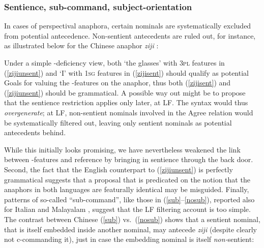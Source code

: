 \documentclass[output=paper, modfonts, nonflat]{langsci/langscibook}
\begin{document}
 \subsubsection{Sentience, sub-command, subject-orientation}

 In cases of perspectival anaphora, certain nominals are
 systematically excluded from potential antecedence. Non-sentient
 antecedents are ruled out, for instance, as illustrated below for the
 Chinese anaphor \textit{ziji} \citep{huangliu:2001}:

  \z

\noindent Under a simple \ph-deficiency view, both `the glasses' with
 \textsc{3pl} features in (\ref{zijiunsent}) and `I' with \textsc{1sg}
 features in (\ref{zijisent}) should qualify as potential Goals for
 valuing the \ph-features on the anaphor, thus both (\ref{zijisent})
 and (\ref{zijiunsent}) should be grammatical. A possible way out might
 be to propose that the sentience restriction applies only later, at
 LF. The syntax would thus \emph{overgenerate}; at LF, non-sentient
 nominals involved in the Agree relation would be systematically
 filtered out, leaving only sentient nominals as potential antecedents
 behind.

 While this initially looks promising, we have nevertheless
 weakened the link between \ph-features and reference by bringing in
 sentience through the back door. Second, the fact that the English
 counterpart to (\ref{zijiunsent}) is perfectly grammatical suggests
 that a proposal that is predicated on the notion that the anaphors in
 both languages are featurally identical may be misguided. Finally,
 patterns of so-called ``sub-command'', like those in
 (\ref{sub}--\ref{nosub}), reported also for Italian
 \citep{giorgi:2006} and Malayalam \citep{jayaseelan:1997}, suggest
 that the LF filtering account is too simple. The contrast between
 Chinese (\ref{sub}) vs.\ (\ref{nosub}) shows that a sentient nominal,
 that is itself embedded inside another nominal, may antecede
 \textit{ziji} (despite clearly not c-commanding it), just in case the
 embedding nominal is itself \emph{non-}sentient:
  
\end{document}
